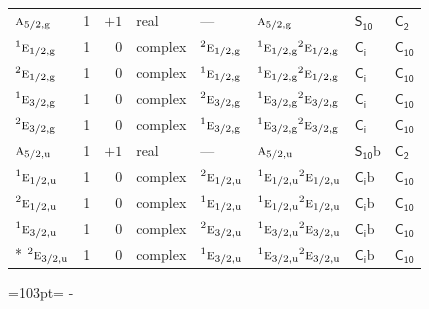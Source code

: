 \documentclass[10pt,a4paper]{article}
\makeatletter
\def\grouprule#1#2{\noalign{\marks\LTgroupmarks{\the\belowrulesep}\nobreak\vskip#1%
  \vskip\aboverulesep}\multispan\LT@cols\unskip{\leaders\hrule\@height#2\hfill\kern\z@}\cr
  \noalign{\penalty\LTrulebreak\vskip\belowrulesep\global\@lastruleclass\z@}}
\newcommand{\needspace}[1]{\par\penalty-100\begingroup\dimen0=#1\relax\dimen2=\pagegoal
  \advance\dimen2-\pagetotal\ifdim\dimen0>\dimen2\relax\ifdim\dimen2>0pt\vfil\break\fi\fi
  \endgroup}
\numberwithin{equation}{section}
\newcommand{\grp}[1]{\mathsf{#1}}
\newcommand{\irr}[1]{\text{\normalfont\scshape #1}}
\newcommand{\conjpair}[1]{{}^{#1}}
\newcommand{\ptag}[1]{\mathrm{#1}}
\newcommand{\secondclass}{\mathrm{b}}
\makeatother
\begin{document}
{\begin{longtable}{@{}lrrlllll@{}}
\grouprule{0pt}{\lightrulewidth}
$\irr{a}_{5/2,\ptag{g}}$ & 1 & $+1$ & real & --- & $\irr{a}_{5/2,\ptag{g}}$ & \href{S10.pdf}{$\grp{S_{10}}$} & \href{../../../rotation/data/pdf/C2.pdf}{$\grp{C_{2}}$}\\
$\conjpair{1}\irr{e}_{1/2,\ptag{g}}$ & 1 & $0$ & complex & $\conjpair{2}\irr{e}_{1/2,\ptag{g}}$ & $\conjpair{1}\irr{e}_{1/2,\ptag{g}}\conjpair{2}\irr{e}_{1/2,\ptag{g}}$ & \href{S2.pdf}{$\grp{C_{i}}$} & \href{../../../rotation/data/pdf/C10.pdf}{$\grp{C_{10}}$}\\
$\conjpair{2}\irr{e}_{1/2,\ptag{g}}$ & 1 & $0$ & complex & $\conjpair{1}\irr{e}_{1/2,\ptag{g}}$ & $\conjpair{1}\irr{e}_{1/2,\ptag{g}}\conjpair{2}\irr{e}_{1/2,\ptag{g}}$ & \href{S2.pdf}{$\grp{C_{i}}$} & \href{../../../rotation/data/pdf/C10.pdf}{$\grp{C_{10}}$}\\
$\conjpair{1}\irr{e}_{3/2,\ptag{g}}$ & 1 & $0$ & complex & $\conjpair{2}\irr{e}_{3/2,\ptag{g}}$ & $\conjpair{1}\irr{e}_{3/2,\ptag{g}}\conjpair{2}\irr{e}_{3/2,\ptag{g}}$ & \href{S2.pdf}{$\grp{C_{i}}$} & \href{../../../rotation/data/pdf/C10.pdf}{$\grp{C_{10}}$}\\
$\conjpair{2}\irr{e}_{3/2,\ptag{g}}$ & 1 & $0$ & complex & $\conjpair{1}\irr{e}_{3/2,\ptag{g}}$ & $\conjpair{1}\irr{e}_{3/2,\ptag{g}}\conjpair{2}\irr{e}_{3/2,\ptag{g}}$ & \href{S2.pdf}{$\grp{C_{i}}$} & \href{../../../rotation/data/pdf/C10.pdf}{$\grp{C_{10}}$}\\
$\irr{a}_{5/2,\ptag{u}}$ & 1 & $+1$ & real & --- & $\irr{a}_{5/2,\ptag{u}}$ & \href{S10b.pdf}{$\grp{S_{10}}\secondclass$} & \href{../../../rotation/data/pdf/C2.pdf}{$\grp{C_{2}}$}\\
$\conjpair{1}\irr{e}_{1/2,\ptag{u}}$ & 1 & $0$ & complex & $\conjpair{2}\irr{e}_{1/2,\ptag{u}}$ & $\conjpair{1}\irr{e}_{1/2,\ptag{u}}\conjpair{2}\irr{e}_{1/2,\ptag{u}}$ & \href{S2b.pdf}{$\grp{C_{i}}\secondclass$} & \href{../../../rotation/data/pdf/C10.pdf}{$\grp{C_{10}}$}\\
$\conjpair{2}\irr{e}_{1/2,\ptag{u}}$ & 1 & $0$ & complex & $\conjpair{1}\irr{e}_{1/2,\ptag{u}}$ & $\conjpair{1}\irr{e}_{1/2,\ptag{u}}\conjpair{2}\irr{e}_{1/2,\ptag{u}}$ & \href{S2b.pdf}{$\grp{C_{i}}\secondclass$} & \href{../../../rotation/data/pdf/C10.pdf}{$\grp{C_{10}}$}\\
$\conjpair{1}\irr{e}_{3/2,\ptag{u}}$ & 1 & $0$ & complex & $\conjpair{2}\irr{e}_{3/2,\ptag{u}}$ & $\conjpair{1}\irr{e}_{3/2,\ptag{u}}\conjpair{2}\irr{e}_{3/2,\ptag{u}}$ & \href{S2b.pdf}{$\grp{C_{i}}\secondclass$} & \href{../../../rotation/data/pdf/C10.pdf}{$\grp{C_{10}}$}\\*
$\conjpair{2}\irr{e}_{3/2,\ptag{u}}$ & 1 & $0$ & complex & $\conjpair{1}\irr{e}_{3/2,\ptag{u}}$ & $\conjpair{1}\irr{e}_{3/2,\ptag{u}}\conjpair{2}\irr{e}_{3/2,\ptag{u}}$ & \href{S2b.pdf}{$\grp{C_{i}}\secondclass$} & \href{../../../rotation/data/pdf/C10.pdf}{$\grp{C_{10}}$}\\
\bottomrule\end{longtable}}
\needspace{103pt}
\end{document}

